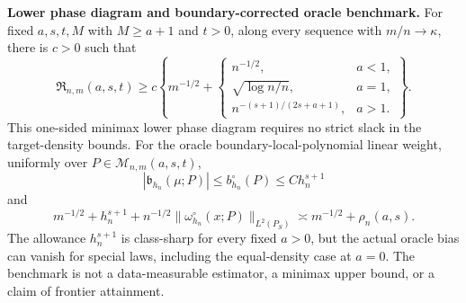 \textbf{Lower phase diagram and boundary-corrected oracle benchmark.}
For fixed \(a,s,t,M\) with \(M\ge a+1\) and \(t>0\), along every sequence with \(m/n\to\kappa\), there is \(c>0\) such that
\[
\mathfrak R_{n,m}(a,s,t)\ge c\left\{m^{-1/2}+\begin{cases}
n^{-1/2},&a<1,\\
\sqrt{\log n/n},&a=1,\\
n^{-(s+1)/(2s+a+1)},&a>1.
\end{cases}\right\}.
\]
This one-sided minimax lower phase diagram requires no strict slack in the target-density bounds. For the oracle boundary-local-polynomial linear weight, uniformly over \(P\in\mathcal M_{n,m}(a,s,t)\),
\[
|\mathfrak b_{h_n}(\mu;P)|\le b_{h_n}^{\circ}(P)\le C h_n^{s+1}
\]
and
\[
m^{-1/2}+h_n^{s+1}
+n^{-1/2}\|\omega_{h_n}^{\circ}(x;P)\|_{L^2(P_S)}
\asymp m^{-1/2}+\rho_n(a,s).
\]
The allowance \(h_n^{s+1}\) is class-sharp for every fixed \(a>0\), but the actual oracle bias can vanish for special laws, including the equal-density case at \(a=0\). The benchmark is not a data-measurable estimator, a minimax upper bound, or a claim of frontier attainment.